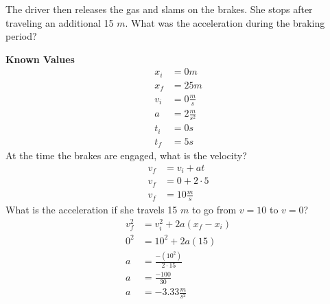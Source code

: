 \documentclass[12pt, letterpaper]{article}
\begin{document}
\begin{example}
  The driver then releases the gas and slams on the brakes. She stops after traveling an
  additional 15 $m$. What was the acceleration during the braking period?

  \vspace{35pt}
  \begin{tikzpicture}
    
  \end{tikzpicture}
  \vspace{-20pt}

  \begin{tcolorbox}[
    standard jigsaw, %
    colframe=fg,
    boxrule=0px,
    opacityback=0,
    sidebyside,
    lefthand width=100px,
    coltext=fg,
  ]
  \textbf{Known Values}
  \begin{align*}
    x_i &= 0m                \\
    x_f &= 25m               \\
    v_i &= 0 \frac{m}{s}     \\
    a   &= 2 \frac{m}{s^2}   \\
    t_i &= 0s                \\
    t_f &= 5s
  \end{align*}
  \tcblower
  At the time the brakes are engaged, what is the velocity?
  \begin{align*}
    v_f &= v_i+at         \\
    v_f &= 0+2 \cdot 5    \\
    v_f &= 10 \frac{m}{s}
  \end{align*}
  What is the acceleration if she travels 15 $m$ to go from $v=10$ to $v=0$?
  \begin{align*}
    v_f^2 &= v_i^2 + 2a(x_f-x_i)        \\
    0^2   &= 10^2 + 2a(15)              \\
    a     &= \frac{-(10^2)}{2 \cdot 15} \\
    a     &= \frac{-100}{30}            \\
    a     &= -3.33 \frac{m}{s^2}
  \end{align*}
  \end{tcolorbox}
\end{example}
\end{document}

